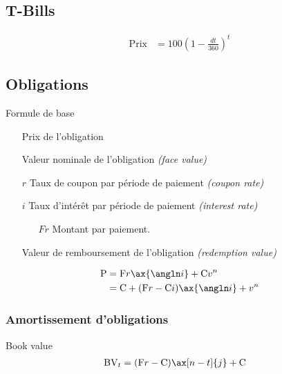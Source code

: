 \documentclass[10pt, french]{article}
\begin{document}
\begin{multicols*}{3}
\subsection*{T-Bills}

\begin{align*}
	\textrm{Prix}	
	&=	100 \left( 1 - \frac{dt}{360} \right)^{t}
\end{align*}

\subsection*{Obligations}

Formule de base

\begin{enumerate}
	\item[\text{P}] Prix de l'obligation 
	\item[\text{F}] Valeur nominale de l'obligation \textit{(face value)}
	\item[$r$] Taux de coupon par période de paiement \textit{(coupon rate)}
	\item[$i$] Taux d'intérêt par période de paiement \textit{(interest rate)}
	\begin{enumerate}
		\item[$Fr$] Montant par paiement.
	\end{enumerate}
	\item[\text{C}] Valeur de remboursement de l'obligation \textit{(redemption value)}
\end{enumerate}

\begin{align*}
	\text{P}
		&=	\text{F} r \ax{\angln i} + \text{C} v^{n} \\
		&=	\text{C} + (\text{F} r - \text{C} i) \ax{\angln i} +  v^{n} 
\end{align*}

\subsubsection*{Amortissement d'obligations}

Book value
\begin{align*}
	\text{BV}_{t}
		&=	(\text{F}r - \text{C}) \ax[n - t]{j} + \text{C}
\end{align*}

\end{multicols*}
\end{document}

